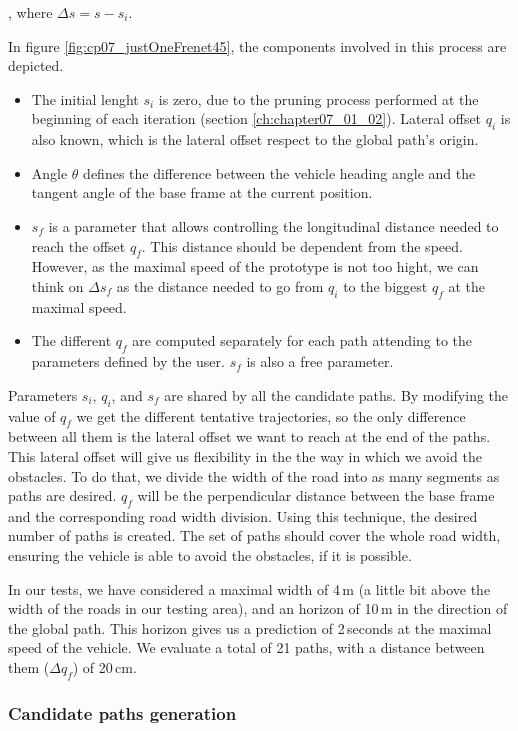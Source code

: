 , where $\Delta s = s - s_i$.

In figure \ref{fig:cp07_justOneFrenet45}, the components involved in this process are depicted.
\begin{itemize}
 \item The initial lenght $s_i$ is zero, due to the pruning process performed at the beginning of each iteration (section \ref{ch:chapter07_01_02}). Lateral offset $q_i$ is also known, which is the lateral offset respect to the global path's origin.
 \item Angle $\theta$ defines the difference between the vehicle heading angle and the tangent angle of the base frame at the current position.
 \item $s_f$ is a parameter that allows controlling the longitudinal distance needed to reach the offset $q_f$. This distance should be dependent from the speed. However, as the maximal speed of the prototype is not too hight, we can think on $\Delta s_f$ as the distance needed to go from $q_i$ to the biggest $q_f$ at the maximal speed.
 \item The different $q_f$ are computed separately for each path attending to the parameters defined by the user. $s_f$ is also a free parameter.
\end{itemize}

Parameters $s_i$, $q_i$, and $s_f$ are shared by all the candidate paths. By modifying the value of $q_f$ we get the different tentative trajectories, so the only difference between all them is the lateral offset we want to reach at the end of the paths. This lateral offset will give us flexibility in the the way in which we avoid the obstacles. To do that, we divide the width of the road into as many segments as paths are desired. $q_f$ will be the perpendicular distance between the base frame and the corresponding road width division. Using this technique, the desired number of paths is created. The set of paths should cover the whole road width, ensuring the vehicle is able to avoid the obstacles, if it is possible.

In our tests, we have considered a maximal width of 4\,m (a little bit above the width of the roads in our testing area), and an horizon of 10\,m in the direction of the global path. This horizon gives us a prediction of 2\,seconds at the maximal speed of the vehicle. We evaluate a total of 21 paths, with a distance between them ($\Delta q_f$) of 20\,cm.

\subsubsection{Candidate paths generation}\label{ch:chapter07_01_03_02}

